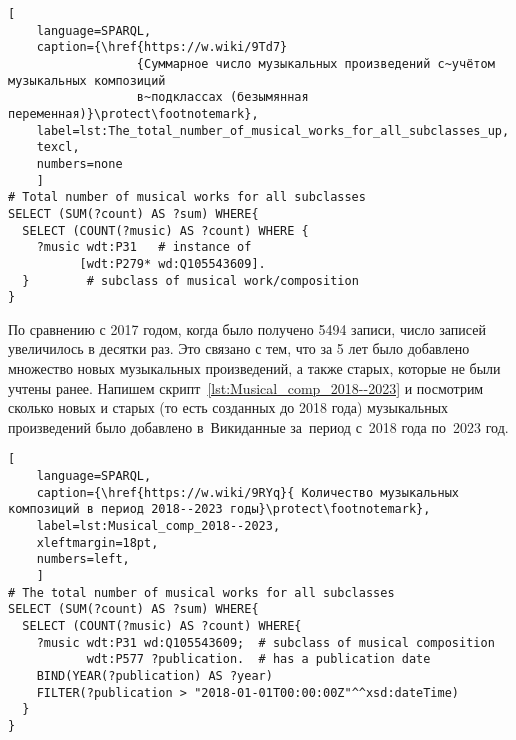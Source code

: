 \begin{lstlisting}[ 
    language=SPARQL,
    caption={\href{https://w.wiki/9Td7}
                  {Суммарное число музыкальных произведений с~учётом музыкальных композиций 
                  в~подклассах (безымянная переменная)}\protect\footnotemark},
    label=lst:The_total_number_of_musical_works_for_all_subclasses_up,
    texcl,
    numbers=none
    ]
# Total number of musical works for all subclasses
SELECT (SUM(?count) AS ?sum) WHERE{
  SELECT (COUNT(?music) AS ?count) WHERE {
    ?music wdt:P31   # instance of
          [wdt:P279* wd:Q105543609].
  }        # subclass of musical work/composition
}
\end{lstlisting}%

По сравнению с 2017 годом, когда было получено \num{5494} записи, число записей увеличилось в десятки раз. Это связано с тем, что за 5 лет было добавлено множество новых музыкальных произведений, а также старых, которые не были учтены ранее.
Напишем скрипт~\ref{lst:Musical_comp_2018--2023} и посмотрим сколько новых и старых (то есть созданных до 2018 года) музыкальных произведений было добавлено в~Викиданные за~период с~2018 года по~2023 год.


\begin{lstlisting}[ 
    language=SPARQL,
    caption={\href{https://w.wiki/9RYq}{ Количество музыкальных композиций в период 2018--2023 годы}\protect\footnotemark},
    label=lst:Musical_comp_2018--2023,
    xleftmargin=18pt,
    numbers=left,
    ]
# The total number of musical works for all subclasses 
SELECT (SUM(?count) AS ?sum) WHERE{
  SELECT (COUNT(?music) AS ?count) WHERE{
    ?music wdt:P31 wd:Q105543609;  # subclass of musical composition
           wdt:P577 ?publication.  # has a publication date
    BIND(YEAR(?publication) AS ?year)
    FILTER(?publication > "2018-01-01T00:00:00Z"^^xsd:dateTime)
  }
}
\end{lstlisting}%


